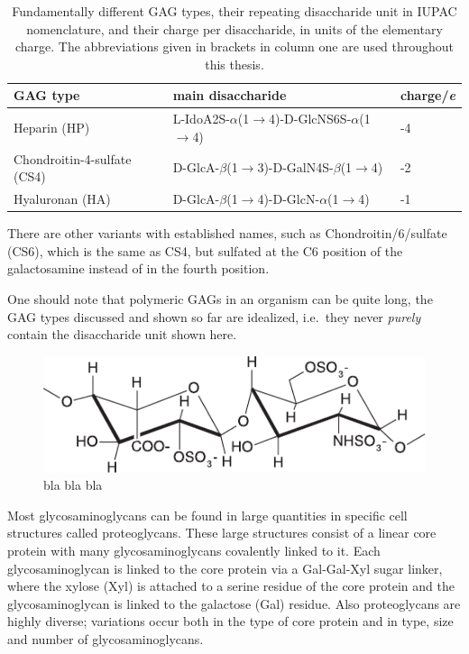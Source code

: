 \begin{table}
\scriptsize
\centering
\renewcommand{\arraystretch}{1.3}
\begin{tabular}{lll}
\midrule
GAG type & main disaccharide & charge/\si{\elementarycharge} \\
\midrule
Heparin (HP) & L-IdoA2S-$\alpha$(1$\rightarrow$4)-D-GlcNS6S-$\alpha$(1$\rightarrow$4) & -4 \\
Chondroitin-4-sulfate (CS4) & D-GlcA-$\beta$(1$\rightarrow$3)-D-GalN4S-$\beta$(1$\rightarrow$4) & -2 \\
Hyaluronan (HA) & D-GlcA-$\beta$(1$\rightarrow$4)-D-GlcN-$\alpha$(1$\rightarrow$4) & -1 \\
\midrule
\end{tabular}
\caption{
Fundamentally different GAG types, their repeating disaccharide unit in IUPAC
nomenclature, and their charge per disaccharide, in units of the elementary
charge. The abbreviations given in brackets in column one are used throughout
this thesis.}
\label{tab:bg:gagtypes}
\end{table}


There are other variants with established names, such as
Chondroitin\-/6\-/sulfate (CS6), which is the same as CS4, but sulfated at the
C6 position of the galactosamine instead of in the fourth position.

One should note that polymeric GAGs in an organism can be quite long, the GAG
types discussed and shown so far are idealized, i.e.\ they never \textit{purely}
contain the disaccharide unit shown here.


\begin{figure}
\centering
\includegraphics[width=1.0\textwidth]{gfx/background/hp_repeating_unit_structure_01.pdf}
\caption[]{
bla bla bla
}
\label{fig:bg:heparin_chemstruct}
\end{figure}


Most glycosaminoglycans can be found in large quantities in specific cell structures called proteoglycans. These large structures consist of a linear core protein with many glycosaminoglycans covalently linked to it. Each glycosaminoglycan is linked to the core protein via a Gal-Gal-Xyl sugar linker, where the xylose (Xyl) is attached to a serine residue of the core protein and the glycosaminoglycan is linked to the galactose (Gal) residue. Also proteoglycans are highly diverse; variations occur both in the type of core protein and in type, size and number of glycosaminoglycans.



